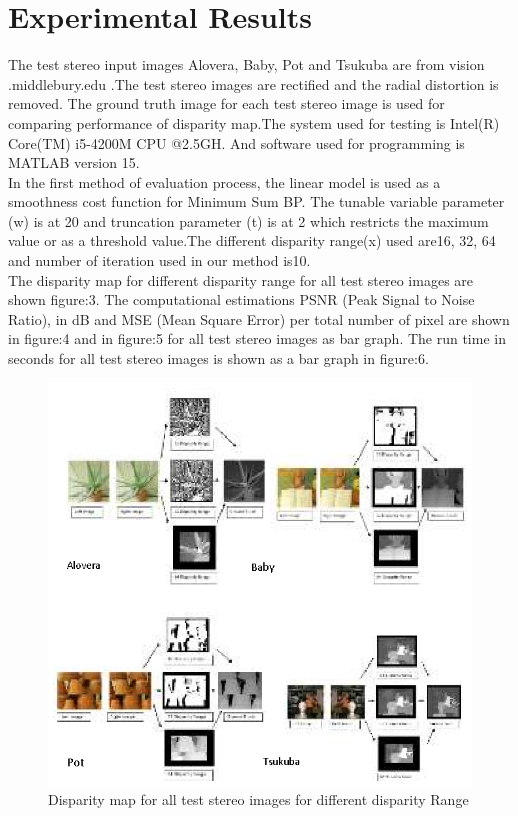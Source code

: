 \documentclass{singlecol-new}
\theoremstyle{TH}{
\newtheorem{lemma}{Lemma}
\newtheorem{theorem}[lemma]{Theorem}
\newtheorem{corrolary}[lemma]{Corrolary}
\newtheorem{conjecture}[lemma]{Conjecture}
\newtheorem{proposition}[lemma]{Proposition}
\newtheorem{claim}[lemma]{Claim}
\newtheorem{stheorem}[lemma]{Wrong Theorem}
\newtheorem{algorithm}{Algorithm}
}
\theoremstyle{THrm}{
\newtheorem{definition}{Definition}[section]
\newtheorem{question}{Question}[section]
\newtheorem{remark}{Remark}
\newtheorem{scheme}{Scheme}
}
\theoremstyle{THhit}{
\newtheorem{case}{Case}[section]
}
\begin{document}
\section{Experimental Results }
The test stereo input images Alovera, Baby, Pot and Tsukuba are from vision .middlebury.edu .The test stereo images are rectified and the radial distortion is removed. The ground truth image for each test stereo image is used for comparing performance of disparity map.The  system used for testing is Intel(R) Core(TM) i5-4200M CPU @2.5GH. And software used for programming is MATLAB version 15.\\
In the first method of evaluation process, the linear model is used as a smoothness cost function for Minimum Sum BP. The tunable variable parameter (w) is at 20 and truncation parameter (t) is at 2 which restricts the maximum value or as a threshold value.The  different  disparity range(x) used are16, 32, 64  and  number of iteration used in our method is10.\\ The disparity map for different disparity range for all test stereo images are shown figure:3.
The computational estimations  PSNR (Peak Signal to Noise Ratio),  in dB and MSE (Mean Square Error) per total number of pixel are shown in figure:4    and in figure:5 for all test stereo images as bar graph. The run time in seconds for all test stereo images is shown as a bar graph in figure:6.
\begin{figure}

\includegraphics{figure4.eps}
\caption{ Disparity map for all test stereo images for different disparity Range}\label{fig:editpublish}
\end{figure}
\end{document}
